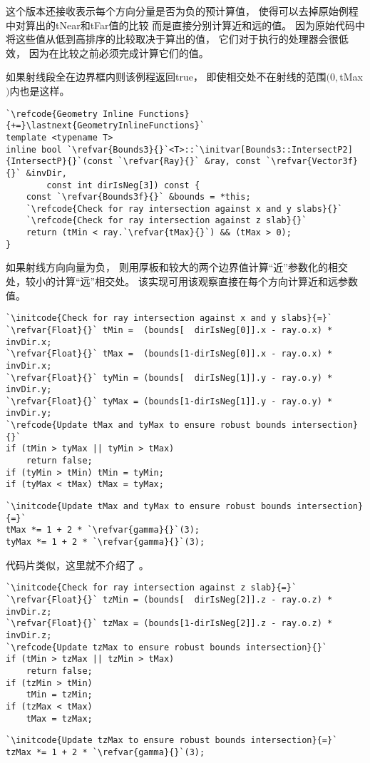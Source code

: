 这个版本还接收表示每个方向分量是否为负的预计算值，
使得可以去掉原始例程中对算出的{\ttfamily tNear}和{\ttfamily tFar}值的比较
而是直接分别计算近和远的值。
因为原始代码中将这些值从低到高排序的比较取决于算出的值，
它们对于执行的处理器会很低效，
因为在比较之前必须完成计算它们的值。

如果射线段全在边界框内则该例程返回{\ttfamily true}，
即使相交处不在射线的范围$(0,${\ttfamily tMax}$)$内也是这样。
\begin{lstlisting}
`\refcode{Geometry Inline Functions}{+=}\lastnext{GeometryInlineFunctions}`
template <typename T>
inline bool `\refvar{Bounds3}{}`<T>::`\initvar[Bounds3::IntersectP2]{IntersectP}{}`(const `\refvar{Ray}{}` &ray, const `\refvar{Vector3f}{}` &invDir,
        const int dirIsNeg[3]) const {
    const `\refvar{Bounds3f}{}` &bounds = *this;
    `\refcode{Check for ray intersection against x and y slabs}{}`
    `\refcode{Check for ray intersection against z slab}{}`
    return (tMin < ray.`\refvar{tMax}{}`) && (tMax > 0);
}
\end{lstlisting}

如果射线方向向量为负，
则用厚板和较大的两个边界值计算“近”参数化的相交处，较小的计算“远”相交处。
该实现可用该观察直接在每个方向计算近和远参数值。
\begin{lstlisting}
`\initcode{Check for ray intersection against x and y slabs}{=}`
`\refvar{Float}{}` tMin =  (bounds[  dirIsNeg[0]].x - ray.o.x) * invDir.x;
`\refvar{Float}{}` tMax =  (bounds[1-dirIsNeg[0]].x - ray.o.x) * invDir.x;
`\refvar{Float}{}` tyMin = (bounds[  dirIsNeg[1]].y - ray.o.y) * invDir.y;
`\refvar{Float}{}` tyMax = (bounds[1-dirIsNeg[1]].y - ray.o.y) * invDir.y;
`\refcode{Update tMax and tyMax to ensure robust bounds intersection}{}`
if (tMin > tyMax || tyMin > tMax) 
    return false;
if (tyMin > tMin) tMin = tyMin; 
if (tyMax < tMax) tMax = tyMax;
\end{lstlisting}
\begin{lstlisting}
`\initcode{Update tMax and tyMax to ensure robust bounds intersection}{=}`
tMax *= 1 + 2 * `\refvar{gamma}{}`(3);
tyMax *= 1 + 2 * `\refvar{gamma}{}`(3);
\end{lstlisting}

代码片类似，这里就不介绍了
。
\begin{lstlisting}
`\initcode{Check for ray intersection against z slab}{=}`
`\refvar{Float}{}` tzMin = (bounds[  dirIsNeg[2]].z - ray.o.z) * invDir.z;
`\refvar{Float}{}` tzMax = (bounds[1-dirIsNeg[2]].z - ray.o.z) * invDir.z;
`\refcode{Update tzMax to ensure robust bounds intersection}{}`
if (tMin > tzMax || tzMin > tMax)
    return false;
if (tzMin > tMin)
    tMin = tzMin;
if (tzMax < tMax)
    tMax = tzMax;
\end{lstlisting}
\begin{lstlisting}
`\initcode{Update tzMax to ensure robust bounds intersection}{=}`
tzMax *= 1 + 2 * `\refvar{gamma}{}`(3);
\end{lstlisting}

